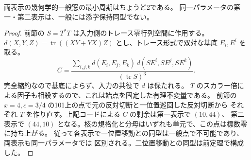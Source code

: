 \begin{proposition}\label{prop:rank-fifteen-oriented-cubic}
両表示の幾何学的一般窓の最小周期はちょうど2である。
同一パラメータの第一・第二表示は、一般には添字保持同型でない。
\end{proposition}
\begin{proof}
前節の $S=T^*T$ は入力側のトレース零行列空間に作用する。
$d(X,Y,Z)=\operatorname{tr}((XY+YX)Z)$ とし、トレース形式で双対な基底 $E_i,E^i$ を取る。
\[
 C=\frac{\sum_{i,j,k}d(E_i,E_j,E_k)\,d(SE^i,SE^j,SE^k)}
                {(\operatorname{tr}S)^3}.
\]
完全縮約なので基底によらず、入力の共役で $d$ は保たれる。
$T$ のスカラー倍による因子も相殺するので、これは始点を固定した有理不変量である。
前節の $x=4,c=3/4$ の101上の点で元の反対切断と一位置巡回した反対切断から
それぞれ $T$ を作り直す。上記コードによる $C$ の剰余は第一表示で $(10,44)$、
第二表示で $(44,10)$ となる。核の規格化と分母はいずれも単元で、この点は標数零に持ち上がる。
従って各表示で一位置移動との同型は一般点で不可能であり、両表示も同一パラメータでは
区別される。二位置移動との同型は前定理で構成した。
\end{proof}

